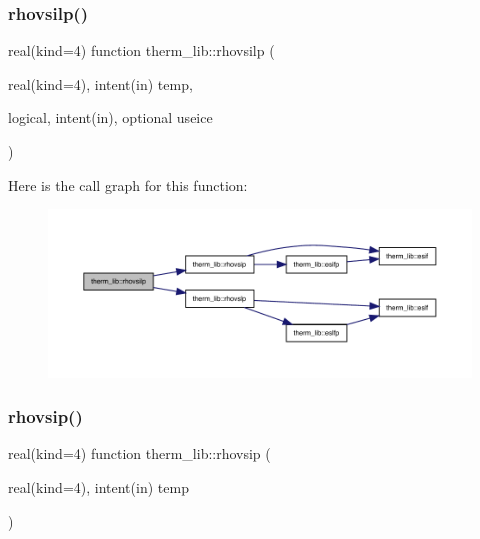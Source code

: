 \subsubsection{\texorpdfstring{rhovsilp()}{rhovsilp()}}
{\footnotesize\ttfamily real(kind=4) function therm\+\_\+lib\+::rhovsilp (\begin{DoxyParamCaption}\item[{real(kind=4), intent(in)}]{temp,  }\item[{logical, intent(in), optional}]{useice }\end{DoxyParamCaption})}

Here is the call graph for this function\+:
\nopagebreak
\begin{figure}[H]
\begin{center}
\leavevmode
\includegraphics[width=350pt]{namespacetherm__lib_a0d35dbf53cc9ae9c3f1b5a5d21126bd8_cgraph}
\end{center}
\end{figure}
\mbox{\label{namespacetherm__lib_a6bc712cfc32b1dcebed47c8a0942b92f}} 
\subsubsection{\texorpdfstring{rhovsip()}{rhovsip()}}
{\footnotesize\ttfamily real(kind=4) function therm\+\_\+lib\+::rhovsip (\begin{DoxyParamCaption}\item[{real(kind=4), intent(in)}]{temp }\end{DoxyParamCaption})}

